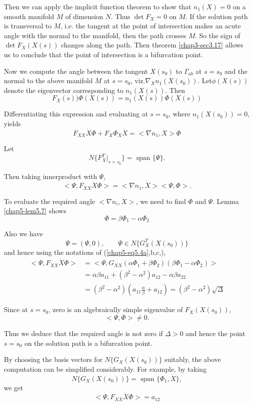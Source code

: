Then we can apply the implicit function theorem to show that
$n_1(X)=0$ on a smooth manifold $M$ of dimension $N$. Thus $\det F_X=0$
on $M$. If the solution path is transversal to $M$, i.e. the tangent
at the point of intersection makes an acute angle with the normal to
the manifold, then the path crosses $M$. So the sign of $\det
F_X(X(s))$ changes along the path. Then theorem \ref{chap3-sec3.17}
allows us to conclude that the point of intersection is a bifurcation
point.  

Now we compute the angle between the tangent $X(s_0)$ to $\Gamma_{ab}$
at $s=s_0$ and the normal to the above manifold $M$ at $s=s_0$,
viz.$\nabla_X n_1(X(s_0))$. 
Let\pageoriginale $\phi(X(s))$ denote the eigenvector corresponding to
$n_1(X(s))$. Then  
$$
F_X(s)) \Phi(X(s))=n_1(X(s))\Phi(X(s))
$$

Differentiating this expression and evaluating at $s=s_0$, where $n_1( 
X(s_0))=0$, yields
$$
F_{XX}\dot{X} \Phi+F_X \Phi_X \dot{X} = < \nabla 
n_1, \dot{X} > \Phi 
$$

Let
$$
N \{ F^T_X|_{s=s_0}\} =\text{ span } \{\Psi\}. 
$$

Then taking innerproduct with $\Psi$,
$$
< \Psi, F_{XX}\dot{X} \Phi > = < \nabla n_1, \dot{X} >
<\Psi,\Phi >. 
$$

To evaluate the required angle $< \nabla n_i, \dot{X}>$, we
need to find $\Phi$ and $\Psi$. Lemma \ref{chap5-lem5.7} shows 
$$
\Phi = \beta \Phi_1-\alpha \Phi_2
$$

Also we have
$$
\Psi = (\Psi,0), \qquad \Psi \in N\{G^T_X(X(s_0))\} 
$$
and hence using the notations of (\ref{chap5-eq5.4a},b,c,),
\begin{align*}
< \Psi, F_{XX}\dot{X} \Phi > & = < \Psi, G_{XX}(\alpha \Phi_1 + \beta
\Phi_2)(\beta \Phi_1-\alpha \Phi_2) >\\ 
& =\alpha \beta a_{11}+(\beta^2 - \alpha^2)a_{12}-\alpha \beta
a_{22}\\ 
& = (\beta^2 - \alpha^2)(a_{11}\frac{\alpha}{\beta}+a_{12}) =(\beta^2
- \alpha^2)\surd \Delta 
\end{align*}

Since at $s=s_0$, zero is an algebraically simple eigenvalue of
$F_X(X(s_0))$, 
$$
< \Psi, \Phi > \neq 0.
$$\pageoriginale

Thus we deduce that the required angle is not zero if $\Delta > 0$ and
hence the point $s=s_0$ on the solution path is a bifurcation point. 

By choosing the basis vectors for $N\{G_X(X(s_0))\}$ suitably, the
above computation can be simplified considerably. For example, by
taking 
$$
N\{G_X(X(s_0))\}= \text{ span }\{\Phi_1,\dot{X}\}, 
$$
we get
$$
< \Psi, F_{XX}\dot{X} \Phi > =a_{12}
$$

